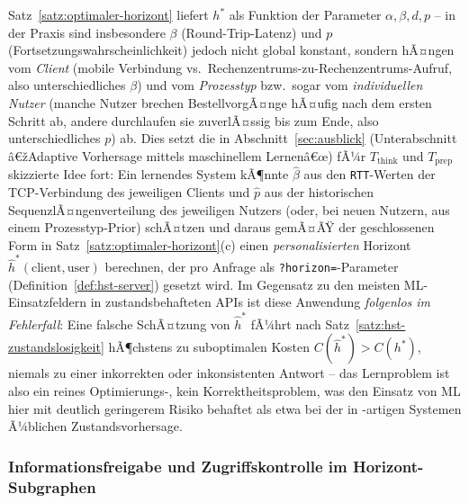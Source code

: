 ﻿\documentclass[a4paper,12pt]{article}
\theoremstyle{definition}
\begin{document}
Satz~\ref{satz:optimaler-horizont} liefert $h^\ast$ als Funktion der Parameter
$\alpha,\beta,d,p$ -- in der Praxis sind insbesondere $\beta$ (Round-Trip-Latenz) und $p$
(Fortsetzungswahrscheinlichkeit) jedoch nicht global konstant, sondern hÃ¤ngen vom
\emph{Client} (mobile Verbindung vs.\ Rechenzentrums-zu-Rechenzentrums-Aufruf, also
unterschiedliches $\beta$) und vom \emph{Prozesstyp} bzw.\ sogar vom \emph{individuellen
Nutzer} (manche Nutzer brechen BestellvorgÃ¤nge hÃ¤ufig nach dem ersten Schritt ab, andere
durchlaufen sie zuverlÃ¤ssig bis zum Ende, also unterschiedliches $p$) ab. Dies setzt die
in Abschnitt~\ref{sec:ausblick} (Unterabschnitt â€žAdaptive Vorhersage mittels
maschinellem Lernenâ€œ) fÃ¼r $T_{\mathrm{think}}$ und $T_{\mathrm{prep}}$ skizzierte Idee
fort: Ein lernendes System kÃ¶nnte $\hat\beta$ aus den \texttt{RTT}-Werten der
TCP-Verbindung des jeweiligen Clients und $\hat p$ aus der historischen
SequenzlÃ¤ngenverteilung des jeweiligen Nutzers (oder, bei neuen Nutzern, aus einem
Prozesstyp-Prior) schÃ¤tzen und daraus gemÃ¤ÃŸ der geschlossenen Form in
Satz~\ref{satz:optimaler-horizont}(c) einen \emph{personalisierten} Horizont
$\hat h^\ast(\text{client},\text{user})$ berechnen, der pro Anfrage als
\texttt{?horizon=}-Parameter (Definition~\ref{def:hst-server}) gesetzt wird. Im
Gegensatz zu den meisten ML-Einsatzfeldern in zustandsbehafteten APIs ist diese Anwendung
\emph{folgenlos im Fehlerfall}: Eine falsche SchÃ¤tzung von $\hat h^\ast$ fÃ¼hrt nach
Satz~\ref{satz:hst-zustandslosigkeit} hÃ¶chstens zu suboptimalen Kosten $C(\hat
h^\ast)>C(h^\ast)$, niemals zu einer inkorrekten oder inkonsistenten Antwort -- das
Lernproblem ist also ein reines Optimierungs-, kein Korrektheitsproblem, was den Einsatz
von ML hier mit deutlich geringerem Risiko behaftet als etwa bei der in
\cite{murata1989}-artigen Systemen Ã¼blichen Zustandsvorhersage.

\subsubsection{Informationsfreigabe und Zugriffskontrolle im Horizont-Subgraphen}
\end{document}
